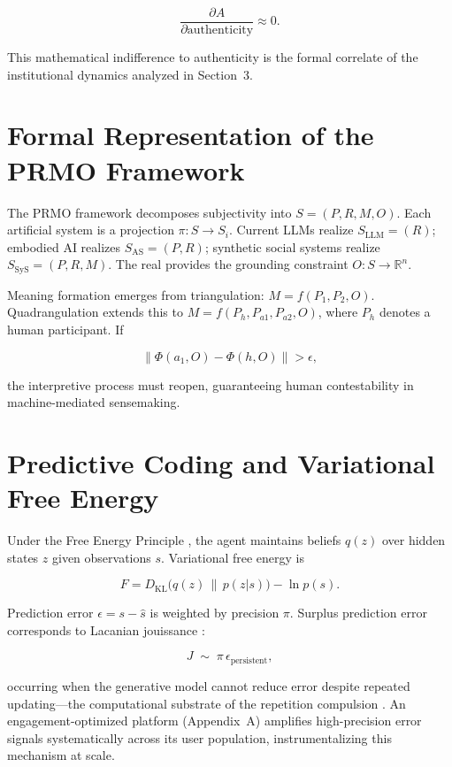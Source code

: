 \documentclass[12pt,a4paper]{article}
\begin{document}
\[
\frac{\partial A}{\partial \mathrm{authenticity}} \approx 0.
\]

This mathematical indifference to authenticity is the formal correlate of the institutional
dynamics analyzed in Section~3.

\section{Formal Representation of the PRMO Framework}

The PRMO framework decomposes subjectivity into $S = (P, R, M, O)$. Each artificial system
is a projection $\pi : S \to S_i$. Current LLMs realize $S_{\mathrm{LLM}} = (R)$; embodied
AI realizes $S_{\mathrm{AS}} = (P, R)$; synthetic social systems realize
$S_{\mathrm{SyS}} = (P, R, M)$. The real provides the grounding constraint
$O : S \to \mathbb{R}^n$.

Meaning formation emerges from triangulation:
$M = f(P_1, P_2, O)$. Quadrangulation \citep{jelinek2026} extends this to
$M = f(P_h, P_{a1}, P_{a2}, O)$, where $P_h$ denotes a human participant. If

\[
\|\Phi(a_1, O) - \Phi(h, O)\| > \epsilon,
\]

the interpretive process must reopen, guaranteeing human contestability in machine-mediated
sensemaking.

\section{Predictive Coding and Variational Free Energy}

Under the Free Energy Principle \citep{friston2010}, the agent maintains beliefs $q(z)$ over
hidden states $z$ given observations $s$. Variational free energy is

\[
F = D_{\mathrm{KL}}\!\bigl(q(z)\,\|\,p(z|s)\bigr) - \ln p(s).
\]

Prediction error $\epsilon = s - \hat{s}$ is weighted by precision $\pi$. Surplus prediction
error corresponds to Lacanian jouissance \citep{lacan2006,dallaglio2024}:

\[
J \;\sim\; \pi\,\epsilon_{\mathrm{persistent}},
\]

occurring when the generative model cannot reduce error despite repeated updating---the
computational substrate of the repetition compulsion \citep{freud1920}. An engagement-optimized
platform (Appendix~A) amplifies high-precision error signals systematically across its user
population, instrumentalizing this mechanism at scale.
\end{document}
